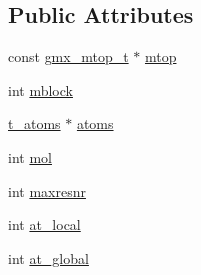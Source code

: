 \subsection*{\-Public \-Attributes}
\begin{DoxyCompactItemize}
\item 
const \hyperlink{structgmx__mtop__t}{gmx\-\_\-mtop\-\_\-t} $\ast$ \hyperlink{structgmx__mtop__atomloop__all_aad0d6e3298d0926999c181e3f68bcdc1}{mtop}
\item 
int \hyperlink{structgmx__mtop__atomloop__all_ab920c91aeda2fbfcfc7c5f2cea5fc257}{mblock}
\item 
\hyperlink{structt__atoms}{t\-\_\-atoms} $\ast$ \hyperlink{structgmx__mtop__atomloop__all_a02945fbfa55301e1f89942f02e483612}{atoms}
\item 
int \hyperlink{structgmx__mtop__atomloop__all_a6771617091fdd7a807d0d07e69d1b6cf}{mol}
\item 
int \hyperlink{structgmx__mtop__atomloop__all_a8db239e66302e7bca13be44f2c750111}{maxresnr}
\item 
int \hyperlink{structgmx__mtop__atomloop__all_ac4994a8d77b192712b0a48c17374f000}{at\-\_\-local}
\item 
int \hyperlink{structgmx__mtop__atomloop__all_a9ad85e7c29896a9a2a754237bb89203c}{at\-\_\-global}
\end{DoxyCompactItemize}


